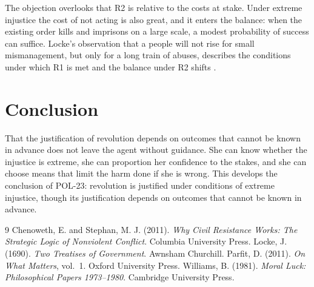 \documentclass{situationist-preprint}
\begin{document}
\begin{reply}
The objection overlooks that R2 is relative to the costs at stake. Under extreme injustice the cost of not acting is also great, and it enters the balance: when the existing order kills and imprisons on a large scale, a modest probability of success can suffice. Locke's observation that a people will not rise for small mismanagement, but only for a long train of abuses, describes the conditions under which R1 is met and the balance under R2 shifts \citep[\S225]{Locke1690}.
\end{reply}

\section{Conclusion}

That the justification of revolution depends on outcomes that cannot be known in advance does not leave the agent without guidance. She can know whether the injustice is extreme, she can proportion her confidence to the stakes, and she can choose means that limit the harm done if she is wrong. This develops the conclusion of POL-23: revolution is justified under conditions of extreme injustice, though its justification depends on outcomes that cannot be known in advance.

\begin{thebibliography}{9}\small
{} Chenoweth, E. and Stephan, M. J. (2011). \emph{Why Civil Resistance Works: The Strategic Logic of Nonviolent Conflict}. Columbia University Press.
 Locke, J. (1690). \emph{Two Treatises of Government}. Awnsham Churchill.
 Parfit, D. (2011). \emph{On What Matters}, vol.~1. Oxford University Press.
 Williams, B. (1981). \emph{Moral Luck: Philosophical Papers 1973--1980}. Cambridge University Press.
\end{thebibliography}
\end{document}
